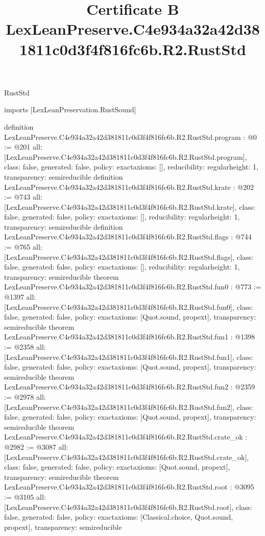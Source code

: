 \begin{lexlean}{RustStd}
\title{Certificate B LexLeanPreserve.C4e934a32a42d381811c0d3f4f816fc6b.R2.RustStd}
\begin{coremodule}
imports [LexLeanPreservation.RustSound]

definition LexLeanPreserve.C4e934a32a42d381811c0d3f4f816fc6b.R2.RustStd.program : @0 := @201 {
  all: [LexLeanPreserve.C4e934a32a42d381811c0d3f4f816fc6b.R2.RustStd.program],
  class: false,
  generated: false,
  policy: exact{axioms: []},
  reducibility: regular{height: 1},
  transparency: semireducible
}
definition LexLeanPreserve.C4e934a32a42d381811c0d3f4f816fc6b.R2.RustStd.krate : @202 := @743 {
  all: [LexLeanPreserve.C4e934a32a42d381811c0d3f4f816fc6b.R2.RustStd.krate],
  class: false,
  generated: false,
  policy: exact{axioms: []},
  reducibility: regular{height: 1},
  transparency: semireducible
}
definition LexLeanPreserve.C4e934a32a42d381811c0d3f4f816fc6b.R2.RustStd.flags : @744 := @765 {
  all: [LexLeanPreserve.C4e934a32a42d381811c0d3f4f816fc6b.R2.RustStd.flags],
  class: false,
  generated: false,
  policy: exact{axioms: []},
  reducibility: regular{height: 1},
  transparency: semireducible
}
theorem LexLeanPreserve.C4e934a32a42d381811c0d3f4f816fc6b.R2.RustStd.fun0 : @773 := @1397 {
  all: [LexLeanPreserve.C4e934a32a42d381811c0d3f4f816fc6b.R2.RustStd.fun0],
  class: false,
  generated: false,
  policy: exact{axioms: [Quot.sound, propext]},
  transparency: semireducible
}
theorem LexLeanPreserve.C4e934a32a42d381811c0d3f4f816fc6b.R2.RustStd.fun1 : @1398 := @2358 {
  all: [LexLeanPreserve.C4e934a32a42d381811c0d3f4f816fc6b.R2.RustStd.fun1],
  class: false,
  generated: false,
  policy: exact{axioms: [Quot.sound, propext]},
  transparency: semireducible
}
theorem LexLeanPreserve.C4e934a32a42d381811c0d3f4f816fc6b.R2.RustStd.fun2 : @2359 := @2978 {
  all: [LexLeanPreserve.C4e934a32a42d381811c0d3f4f816fc6b.R2.RustStd.fun2],
  class: false,
  generated: false,
  policy: exact{axioms: [Quot.sound, propext]},
  transparency: semireducible
}
theorem LexLeanPreserve.C4e934a32a42d381811c0d3f4f816fc6b.R2.RustStd.crate_ok : @2982 := @3087 {
  all: [LexLeanPreserve.C4e934a32a42d381811c0d3f4f816fc6b.R2.RustStd.crate_ok],
  class: false,
  generated: false,
  policy: exact{axioms: [Quot.sound, propext]},
  transparency: semireducible
}
theorem LexLeanPreserve.C4e934a32a42d381811c0d3f4f816fc6b.R2.RustStd.root : @3095 := @3105 {
  all: [LexLeanPreserve.C4e934a32a42d381811c0d3f4f816fc6b.R2.RustStd.root],
  class: false,
  generated: false,
  policy: exact{axioms: [Classical.choice, Quot.sound, propext]},
  transparency: semireducible
}


\end{coremodule}
\end{lexlean}
